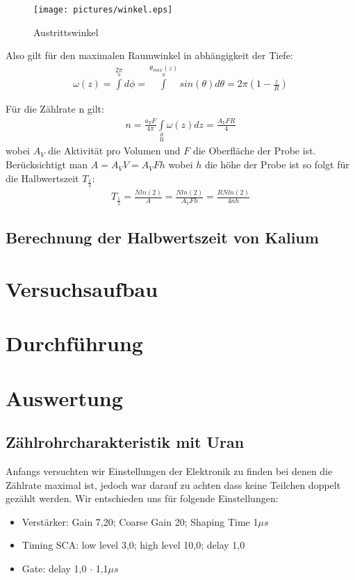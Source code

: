 \documentclass[12pt]{article}
\begin{document}
\begin{figure}[H]  
\centering
\texttt{[image: pictures/winkel.eps]}
\label{winkel}\caption{Austrittswinkel}
\end{figure}

Also gilt für den maximalen Raumwinkel in abhängigkeit der Tiefe:
\begin{align}
 \omega(z)= \int \limits^{2\pi} \limits_{0} d\phi = \int \limits^{\theta_{max}(z)} \limits_{0} sin(\theta)d\theta = 2\pi \left( 1 - \frac{z}{R} \right) 
\end{align}

Für die Zählrate n gilt:
\begin{align}
 n = \frac{a_V F}{4 \pi} \int \limits_0 \limits^R \omega (z) dz = \frac{A_V F R }{4}
\end{align}
wobei $A_V$ die Aktivität pro Volumen und $F$ die Oberfläche der Probe ist. Berücksichtigt man $A=A_V V = A_V F h$ wobei $h$ die höhe der Probe ist so folgt für die Halbwertszeit $T_{\frac{1}{2}}$:
\begin{align}
 T_{\frac{1}{2}} = \frac{N ln(2)}{A} = \frac{N ln(2)}{A_V F h} = \frac{R N ln(2)}{4 n h}
\end{align}


\subsection{Berechnung der Halbwertszeit von Kalium}


\section{Versuchsaufbau}

\section{Durchführung}

\section{Auswertung}
\subsection{Zählrohrcharakteristik mit Uran}
Anfangs versuchten wir Einstellungen der Elektronik zu finden bei denen die Zählrate maximal ist, jedoch war darauf zu achten dass keine Teilchen doppelt
gezählt werden. Wir entschieden uns für folgende Einstellungen:
\begin{itemize}
 \item Verstärker: Gain 7,20; Coarse Gain 20; Shaping Time 1$\mu s$
 \item Timing SCA: low level 3,0; high level 10,0; delay 1,0
 \item Gate: delay 1,0 $\cdot$ 1,1$\mu s$
\end{itemize}
\end{document}
